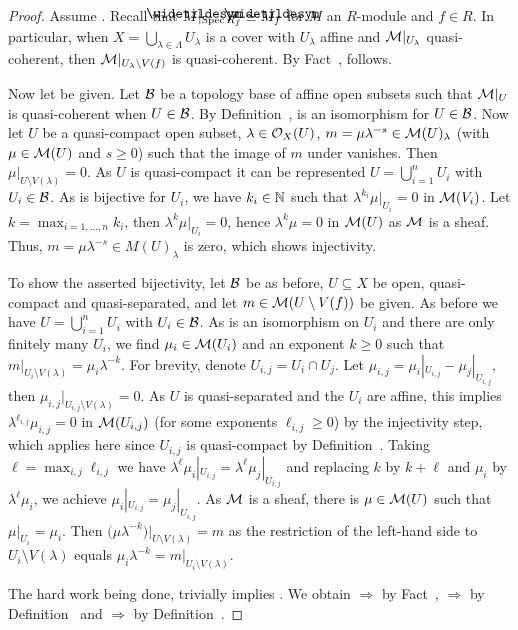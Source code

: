 \documentclass[a4paper,parskip=half,numbers=enddot, DIV=12]{scrreprt}
\begin{document}
\begin{proof}
    Assume . Recall that $\snake M|_{\Spec R_f} \simeq \snake M_f$ for $M$ an $R$-module and $f\in R$. In particular, when $X = \bigcup_{\lambda\in\Lambda}U_\lambda$ is a cover with $U_\lambda$ affine and $\mathcal{M}|_{U_\lambda}$ quasi-coherent, then $\mathcal{M}|_{U_\lambda\setminus V(f)}$ is quasi-coherent. By Fact~,  follows.
    
    Now let  be given. Let $\mathcal{B}$ be a topology base of affine open subsets such that $\mathcal{M}|_U$ is quasi-coherent when $U\in\mathcal{B}$. By Definition~,  is an isomorphism for $U\in\mathcal{B}$. Now let $U$ be a quasi-compact open subset, $\lambda\in \mathcal{O}_X(U)$, $m=\mu \lambda^{-s}\in \mathcal{M}(U)_\lambda$ (with $\mu\in \mathcal{M}(U)$ and $s\geq0$) such that the image of $m$ under  vanishes. Then $\mu|_{U\setminus V(\lambda)} = 0$. As $U$ is quasi-compact it can be represented $U=\bigcup_{i=1}^n U_i$ with $U_i\in\mathcal{B}$. As  is bijective for $U_i$, we have $k_i\in\mathbb{N}$ such that $\lambda^{k_i}\mu|_{U_i}= 0$ in $\mathcal{M}(V_i)$. Let $k=\max_{i=1,\ldots,n} k_i$, then $\lambda^k\mu|_{U_i} = 0$, hence $\lambda^k\mu = 0$ in $\mathcal{M}(U)$ as $\mathcal{M}$ is a sheaf. Thus, $m = \mu \lambda^{-s}\in M(U)_\lambda$ is zero, which shows injectivity.
    
    To show the asserted bijectivity, let $\mathcal{B}$ be as before, $U\subseteq X$ be open, quasi-compact and quasi-separated, and let $m\in \mathcal{M}(U\setminus V(f))$ be given. As before we have $U=\bigcup_{i=1}^n U_i$ with $U_i\in\mathcal{B}$. As  is an isomorphism on $U_i$ and there are only finitely many $U_i$, we find $\mu_i\in\mathcal{M}(U_i)$ and an exponent $k\geq0$ such that $m|_{U_i\setminus V(\lambda)} = \mu_i\lambda^{-k}$. For brevity, denote $U_{i,j}=U_i\cap U_j$. Let $\mu_{i,j} = \mu_i|_{U_{i,j}} - \mu_j|_{U_{i,j}}$, then $\mu_{i,j}|_{U_{i,j}\setminus V(\lambda)} = 0$. As $U$ is quasi-separated and the $U_i$ are affine, this implies $\lambda^{\ell_{i,j}} \mu_{i,j} = 0$ in $\mathcal{M}(U_{i,j})$ (for some exponents $\ell_{i,j}\geq0$) by the injectivity step, which applies here since $U_{i,j}$ is quasi-compact by Definition~. Taking $\ell = \max_{i,j}\ell_{i,j}$ we have $\lambda^\ell\mu_i |_{U_{i,j}} = \lambda^\ell\mu_j|_{U_{i,j}}$ and replacing $k$ by $k+\ell$ and $\mu_i$ by $\lambda^\ell \mu_i$, we achieve $\mu_i|_{U_{i,j}} = \mu_j|_{U_{i,j}}$. As $\mathcal{M}$ is a sheaf, there is $\mu\in\mathcal{M}(U)$ such that $\mu|_{U_i} = \mu_i$. Then $\big(\mu \lambda^{-k}\big)|_{U\setminus V(\lambda)} = m$ as the restriction of the left-hand side to $U_i\setminus V(\lambda)$ equals $\mu_i\lambda^{-k} = m|_{U_i\setminus V(\lambda)}$. 
    
    The hard work being done,  trivially implies . We obtain  $\Rightarrow$  by Fact~,  $\Rightarrow$  by Definition~ and  $\Rightarrow$  by Definition~.
\end{proof}
\end{document}
